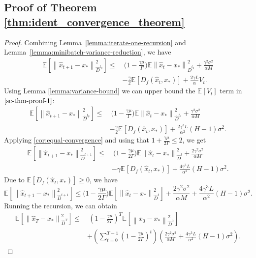\documentclass[sn-mathphys,Numbered]{sn-jnl}%
\newcommand*{\E}{{\mathbb E}}
\renewcommand{\|}{\parallel}
\newcommand\ec[2][]{\ensuremath{\mathbb{E}_{#1} \left[#2\right]}}
\newcommand\ecn[3][]{\ec[#1]{\norm{#2}^2_{#3}}}
\newcommand\br[1]{\left ( #1 \right )}
\newcommand{\norm}[1]{\left\lVert#1\right\rVert}
\newcommand{\sqn}[1]{{\left\lVert#1\right\rVert}^2}
\renewcommand {\*} {\ast}
\begin{document}
\subsection{\bf Proof of Theorem \ref{thm:ident_convergence_theorem}}
\begin{proof}
     Combining Lemma~\ref{lemma:iterate-one-recursion} and Lemma~\ref{lemma:minibatch-variance-reduction}, we have
     \begin{align}
         \label{sc-thm-proof-1}
         \ecn{\hat{x}_{t+1} - x_\ast}{\hat{D}^{t_p}} \leq&\ \Big(1-\frac{\gamma\mu}{\Gamma}\Big) \E \sqn{\hat{x}_t-x_\ast}_{\hat{D}^{t_p}} + \frac{\gamma^2\sigma^2}{\alpha M} \nonumber \\ &- \frac{\gamma}{2} \ec{D_{f} (\hat{x}_t, x_\ast)} +  \frac{2 \gamma L}{\alpha} V_t.
     \end{align}
     Using Lemma \ref{lemma:variance-bound} we can upper bound the $\ec{V_t}$ term in $\eqref{sc-thm-proof-1}$:
     \begin{align*}
         \ecn{\hat{x}_{t+1} - x_\ast}{\hat{D}^{t_p}} \leq&\ \Big(1-\frac{\gamma\mu}{\Gamma}\Big) \E \sqn{\hat{x}_t-x_\ast}_{\hat{D}^{t_p}} + \frac{\gamma^2\sigma^2}{\alpha M} \nonumber \\ &- \frac{\gamma}{2} \ec{D_{f} (\hat{x}_t, x_\ast)} +  \frac{2 \gamma^3 L}{\alpha^2}(H-1)\sigma^2.
     \end{align*}
     Applying \cref{cor:equal-convergence} and using that $1 + \frac{\gamma\mu}{2\Gamma} \leq 2$, we get
     \begin{align*}
         \ecn{\hat{x}_{t+1} - x_\ast}{\hat{D}^{t+1}} \leq&\ \Big(1-\frac{\gamma\mu}{2\Gamma}\Big) \E \sqn{\hat{x}_t-x_\ast}_{\hat{D}^{t}} + \frac{2\gamma^2\sigma^2}{\alpha M} \nonumber \\ &- \gamma \ec{D_{f} (\hat{x}_t, x_\ast)} +  \frac{4 \gamma^3 L}{\alpha^2}(H-1)\sigma^2.
     \end{align*}
     Due to $\ec{D_{f} (\hat{x}_t, x_\ast)} \geq 0$, we have
     \begin{equation*}
         \ecn{\hat{x}_{t+1} - x_\ast}{\hat{D}^{t+1}} \leq \Big(1-\frac{\gamma\mu}{2\Gamma}\Big) \ecn{\hat{x}_t-x_\ast}{\hat{D}^{t}} + \frac{2\gamma^2 \sigma^2}{\alpha M} + \frac{4\gamma^3 L}{\alpha^2} \br{H - 1} \sigma^2.
     \end{equation*}
     Running the recursion, we can obtain
     \begin{align*}
         \ecn{\hat{x}_T-x_\ast}{\hat{D}^{T}} \leq&\ \br{1 - \frac{\gamma\mu}{2\Gamma}}^{T} \ecn{x_0-x_\ast}{\hat{D}^{0}} \\ &+ \br{ \sum_{t=0}^{T-1} \br{1 - \frac{\gamma\mu}{2\Gamma}}^t } \br{ \frac{2\gamma^2 \sigma^2}{\alpha M} + \frac{4\gamma^3L}{\alpha^2} \br{H - 1} \sigma^2 }.

\end{align*}
\end{proof}
\end{document}
